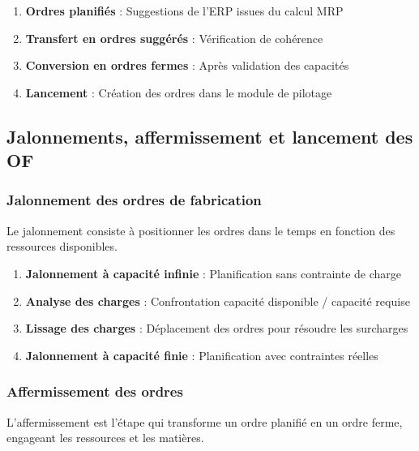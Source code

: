 \documentclass{article}
\begin{document}
\begin{table}[h]
\begin{enumerate}
    \item \textbf{Ordres planifiés} : Suggestions de l'ERP issues du calcul MRP
    \item \textbf{Transfert en ordres suggérés} : Vérification de cohérence
    \item \textbf{Conversion en ordres fermes} : Après validation des capacités
    \item \textbf{Lancement} : Création des ordres dans le module de pilotage
\end{enumerate}

\subsection{Jalonnements, affermissement et lancement des OF}

\subsubsection{Jalonnement des ordres de fabrication}

Le jalonnement consiste à positionner les ordres dans le temps en fonction des ressources disponibles.

\begin{tcolorbox}[colback=grisclair, colframe=gray!70!black, title=Étapes du jalonnement]
\begin{enumerate}
    \item \textbf{Jalonnement à capacité infinie} : Planification sans contrainte de charge
    \item \textbf{Analyse des charges} : Confrontation capacité disponible / capacité requise
    \item \textbf{Lissage des charges} : Déplacement des ordres pour résoudre les surcharges
    \item \textbf{Jalonnement à capacité finie} : Planification avec contraintes réelles
\end{enumerate}
\end{tcolorbox}

\subsubsection{Affermissement des ordres}

L'affermissement est l'étape qui transforme un ordre planifié en un ordre ferme, engageant les ressources et les matières.


\end{table}
\end{document}
